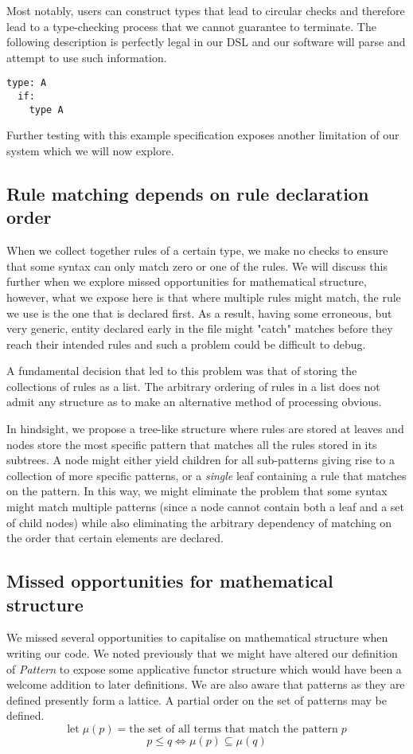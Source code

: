 Most notably, users can construct types that lead to circular
checks and therefore lead to a type-checking process that we cannot
guarantee to terminate. The following description is perfectly legal
in our DSL and our software will parse and attempt to use such
information.
\begin{verbatim}
type: A
  if:
    type A
\end{verbatim}
Further testing with this example specification exposes another
limitation of our system which we will now explore.
\subsection{Rule matching depends on rule declaration order}
When we collect together rules of a certain type, we make no checks to
ensure that some syntax can only match zero or one of the rules. We
will discuss this further when we explore missed opportunities for
mathematical structure, however, what we expose here is that where
multiple rules might match, the rule we use is the one that
is declared first. As a result, having some erroneous, but very
generic, entity declared early in the file might "catch" matches
before they reach their intended rules and such a problem could be
difficult to debug.

A fundamental decision that led to this problem was that of storing
the collections of rules as a list. The arbitrary ordering of rules in
a list does not admit any structure as to make an alternative method of
processing obvious.

In hindsight, we propose a tree-like structure where rules are stored
at leaves and nodes store the most specific pattern that matches all
the rules stored in its subtrees. A node might either yield children
for all sub-patterns giving rise to a collection of more specific
patterns, or a \emph{single} leaf containing a rule that matches on the
pattern. In this way, we might eliminate the problem that some syntax
might match multiple patterns (since a node cannot contain both a leaf
and a set of child nodes) while also eliminating the arbitrary
dependency of matching on the order that certain elements are declared.
\subsection{Missed opportunities for mathematical structure}
We missed several opportunities
to capitalise on mathematical structure when writing our
code. We noted previously that we might have altered 
our definition of \emph{Pattern} to expose some applicative functor
structure which would have been a welcome addition to later
definitions. We are also aware that patterns as they are defined
presently form a lattice. A partial order on the set of patterns may
be defined.
$$
\mbox{let} \;μ(p) = \mbox{the set of all terms that match the pattern}\;p
$$
$$
p \leq q \iff \mu (p) \subseteq  \mu (q)
$$

